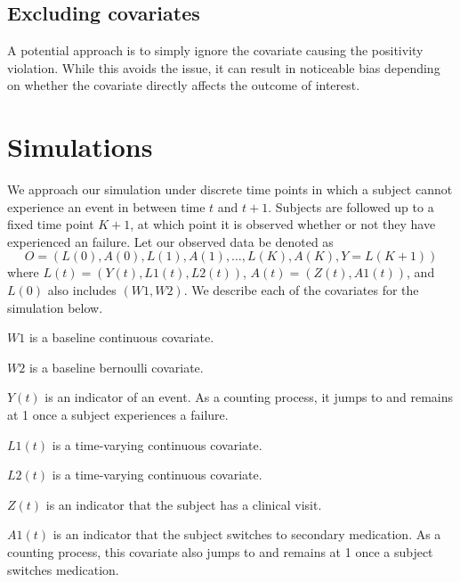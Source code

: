 \documentclass{article}\usepackage[]{graphicx}\usepackage[]{color}
\renewcommand{\indent}{\hskip 20pt}
\begin{document}
\subsection{Excluding covariates}

\indent A potential approach is to simply ignore the covariate causing the
positivity violation. While this avoids the issue, it can result in noticeable bias
depending on whether the covariate directly affects the outcome of interest.


\section{Simulations}

\indent We approach our simulation under discrete time points in which a subject
cannot experience an event in between time $t$ and $t+1$. Subjects are followed up to
a fixed time point $K+1$, at which point it is observed whether or not
they have experienced an failure. Let our observed data be denoted as
\begin{equation}
  O = (L(0), A(0), L(1), A(1), \ldots, L(K), A(K), Y = L(K+1))
\end{equation}
where $L(t)=(Y(t), L1(t), L2(t))$, $A(t)=(Z(t), A1(t))$, and $L(0)$ also
includes $(W1,W2)$. We describe each of the covariates for the simulation below.

\begin{itemize*}
    \item $W1$ is a baseline continuous covariate.  
    \item $W2$ is a baseline bernoulli covariate. 
	\item $Y(t)$ is an indicator of an event. As a counting process, it jumps to
	and remains at 1 once a subject experiences a failure.
    \item $L1(t)$ is a time-varying continuous covariate. 
    \item $L2(t)$ is a time-varying continuous covariate. 
    \item $Z(t)$ is an indicator that the subject has a clinical visit. 
    \item $A1(t)$ is an indicator that the subject switches to
    secondary medication. As a counting process, this covariate also jumps to
    and remains at 1 once a subject switches medication. 
\end{itemize*}
\end{document}

